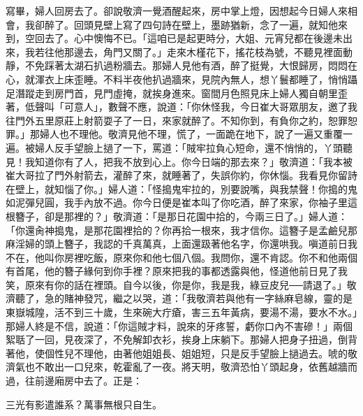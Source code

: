 \begin{showcontents}{}
寫畢，婦人回房去了。卻說敬濟一覺酒醒起來，房中掌上燈，因想起今日婦人來相會，我卻醉了。回頭見壁上寫了四句詩在壁上，墨跡猶新，念了一遍，就知他來到，空回去了。心中懊悔不已。「這咱已是起更時分，大姐、元宵兒都在後邊未出來，我若往他那邊去，角門又關了。」走來木槿花下，搖花枝為號，不聽見裡面動靜，不免踩著太湖石扒過粉牆去。那婦人見他有酒，醉了挺覺，大恨歸房，悶悶在心，就渾衣上床歪睡。不料半夜他扒過牆來，見院內無人，想丫鬟都睡了，悄悄躡足潛蹤走到房門首，見門虛掩，就挨身進來。窗間月色照見床上婦人獨自朝里歪著，低聲叫「可意人」，數聲不應，說道：「你休怪我，今日崔大哥眾朋友，邀了我往門外五里原莊上射箭耍子了一日，來家就醉了。不知你到，有負你之約，恕罪恕罪。」那婦人也不理他。敬濟見他不理，慌了，一面跪在地下，說了一遍又重覆一遍。被婦人反手望臉上撾了一下，罵道：「賊牢拉負心短命，還不悄悄的，丫頭聽見！我知道你有了人，把我不放到心上。你今日端的那去來？」敬濟道：「我本被崔大哥拉了門外射箭去，灌醉了來，就睡著了，失誤你約，你休惱。我看見你留詩在壁上，就知惱了你。」婦人道：「怪搗鬼牢拉的，別要說嘴，與我禁聲！你搗的鬼如泥彈兒圓，我手內放不過。你今日便是崔本叫了你吃酒，醉了來家，你袖子里這根簪子，卻是那裡的？」敬濟道：「是那日花園中拾的，今兩三日了。」婦人道：「你還肏神搗鬼，是那花園裡拾的？你再拾一根來，我才信你。這簪子是孟鹼兒那麻淫婦的頭上簪子，我認的千真萬真，上面還趿著他名字，你還哄我。嗔道前日我不在，他叫你房裡吃飯，原來你和他七個八個。我問你，還不肯認。你不和他兩個有首尾，他的簪子緣何到你手裡？原來把我的事都透露與他，怪道他前日見了我笑，原來有你的話在裡頭。自今以後，你是你，我是我，綠豆皮兒──請退了。」敬濟聽了，急的賭神發咒，繼之以哭，道：「我敬濟若與他有一字絲麻皂線，靈的是東嶽城隍，活不到三十歲，生來碗大疔瘡，害三五年黃病，要湯不湯，要水不水。」那婦人終是不信，說道：「你這賊才料，說來的牙疼誓，虧你口內不害磣！」兩個絮聒了一回，見夜深了，不免解卸衣衫，挨身上床躺下。那婦人把身子扭過，倒背著他，使個性兒不理他，由著他姐姐長、姐姐短，只是反手望臉上撾過去。唬的敬濟氣也不敢出一口兒來，乾霍亂了一夜。將天明，敬濟恐怕丫頭起身，依舊越牆而過，往前邊廂房中去了。正是：

三光有影遣誰系？萬事無根只自生。



\end{showcontents}

